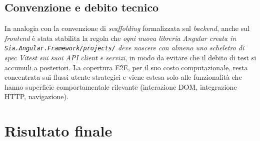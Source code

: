 \subsection{Convenzione e debito tecnico}

In analogia con la convenzione di \emph{scaffolding} formalizzata sul \emph{backend}, anche sul \emph{frontend} è stata stabilita la regola che \emph{ogni nuova libreria Angular creata in \texttt{Sia.Angular.Framework/projects/} deve nascere con almeno uno scheletro di \emph{spec} Vitest sui suoi \emph{API client} e servizi}, in modo da evitare che il debito di test si accumuli a posteriori. La copertura E2E, per il suo costo computazionale, resta concentrata sui flussi utente strategici e viene estesa solo alle funzionalità che hanno superficie comportamentale rilevante (interazione DOM, integrazione HTTP, navigazione).

\section{Risultato finale}

